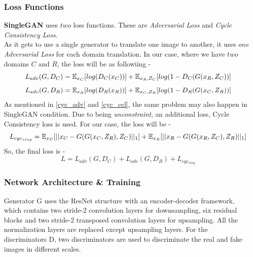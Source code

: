 \subsubsection{Loss Functions}
\textbf{SingleGAN} uses $two$ loss functions. These are \textit{Adversarial Loss} and \textit{Cycle Consistency Loss}.\\
As it gets to use a single generator to translate one image to another, it uses $one$ \textit{Adversarial Loss} for each domain translation. In our case, where we have $two$ domains $C$ and $R$, the loss will be as followiing -
$$L_{adv}(G, D_C) = \operatorname{\mathbb{E}}_{x_C}[log(D_C(x_C))] + \operatorname{\mathbb{E}}_{x_R, Z_C}[log(1 - D_C(G(x_R, Z_C))]$$
$$L_{adv}(G, D_R) = \operatorname{\mathbb{E}}_{x_R}[log(D_R(x_R))] + \operatorname{\mathbb{E}}_{x_C, Z_R}[log(1 - D_R(G(x_C, Z_R))]$$
As mentioned in \ref{cyc_adv} and \ref{cyc_ccl}, the same problem may also happen in SingleGAN condition. Due to being \textit{unconstraint}, an additional loss, Cycle Consistency loss is used. For our case, the loss will be -
$$L_{cyc_{sing}} = \operatorname{\mathbb{E}}_{x_C}[||x_C - G(G(x_C, Z_R), Z_C)||_1] + \operatorname{\mathbb{E}}_{x_R}[||x_R - G(G(x_R, Z_C), Z_R)||_1]$$
So, the final loss is -
$$L = L_{adv}(G, D_C) + L_{adv}(G, D_R) + L_{cyc_{sing}}$$

\subsubsection{Network Architecture \& Training}
Generator G uses the ResNet\cite{DBLP:journals/corr/HeZRS15} structure with an encoder-decoder framework, which contains two stride-2 convolution layers for downsampling, six residual blocks and two stride-2 transposed convolution layers for upsampling. All the normalization layers are replaced except upsampling layers. For the discriminators D, two discriminators\cite{DBLP:journals/corr/IsolaZZE16} are used to discriminate the real and fake images in different scales.

